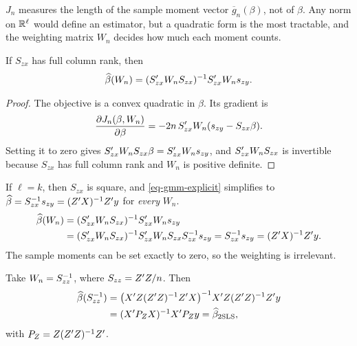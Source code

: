 \documentclass[a4paper,12pt]{article}
\begin{document}
\begin{remark}
	$J_n$ measures the length of the sample moment vector $\overline g_n(\beta)$, not of $\beta$.
	Any norm on $\mathbb{R}^\ell$ would define an estimator,
	but a quadratic form is the most tractable, and the weighting matrix $W_n$ decides how much each moment counts.
\end{remark}

\begin{proposition}\label{prop-explicit}
	If $S_{zx}$ has full column rank, then
	\begin{align}\label{eq-gmm-explicit}
		\widehat\beta(W_n)=(S_{zx}^{\prime} W_nS_{zx})^{-1} S_{zx}^{\prime} W_ns_{zy}.
	\end{align}
\end{proposition}
\begin{proof}
	The objective is a convex quadratic in $\beta$. Its gradient is
	\begin{align*}
		\frac{\partial J_n(\beta,W_n)}{\partial\beta}=-2n\,S_{zx}^{\prime} W_n(s_{zy}-S_{zx}\beta).
	\end{align*}
	Setting it to zero gives $S_{zx}^{\prime} W_nS_{zx}\beta=S_{zx}^{\prime} W_ns_{zy}$,
	and $S_{zx}^{\prime} W_nS_{zx}$ is invertible because $S_{zx}$ has full column rank and $W_n$ is positive definite.
\end{proof}

\begin{example}\label{ex-iv}
	If $\ell=k$, then $S_{zx}$ is square, and \eqref{eq-gmm-explicit} simplifies to $\widehat\beta=S_{zx}^{-1} s_{zy}=(Z^{\prime} X)^{-1} Z^{\prime} y$ for \emph{every} $W_n$.
	\begin{align}
		\widehat\beta(W_n)
		&=(S_{zx}^{\prime} W_nS_{zx})^{-1} S_{zx}^{\prime} W_ns_{zy} \\
		&=(S_{zx}^{\prime} W_nS_{zx})^{-1} S_{zx}^{\prime} W_nS_{zx}S_{zx}^{-1} s_{zy}
		=S_{zx}^{-1} s_{zy}
		=(Z^{\prime} X)^{-1} Z^{\prime} y.
	\end{align}
	The sample moments can be set exactly to zero, so the weighting is irrelevant.
\end{example}

\begin{example}\label{ex-2sls}
	Take $W_n=S_{zz}^{-1}$, where $S_{zz}=Z^{\prime} Z/n$. Then
	\begin{align*}
		\widehat\beta(S_{zz}^{-1})
		&=\bigl(X^{\prime} Z(Z^{\prime} Z)^{-1} Z^{\prime} X\bigr)^{-1} X^{\prime} Z(Z^{\prime} Z)^{-1} Z^{\prime} y \\
		&=(X^{\prime} P_ZX)^{-1} X^{\prime} P_Zy
		=\widehat\beta_{\mathrm{2SLS}},
	\end{align*}
	with $P_Z=Z(Z^{\prime} Z)^{-1} Z^{\prime}$.
\end{example}
\end{document}
